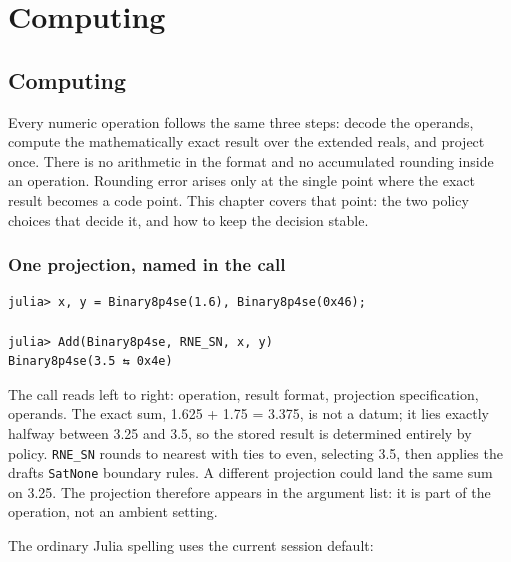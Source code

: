 \part{Computing}


\chapter{Computing}



\label{6001489924641501409}{}


Every numeric operation follows the same three steps: decode the operands, compute the mathematically exact result over the extended reals, and project once. There is no arithmetic {\textquotedbl}in the format{\textquotedbl} and no accumulated rounding inside an operation. Rounding error arises only at the single point where the exact result becomes a code point. This chapter covers that point: the two policy choices that decide it, and how to keep the decision stable.



\section{One projection, named in the call}



\label{13836310120754226451}{}



\begin{verbatim}
julia> x, y = Binary8p4se(1.6), Binary8p4se(0x46);

julia> Add(Binary8p4se, RNE_SN, x, y)
Binary8p4se(3.5 ⇆ 0x4e)
\end{verbatim}



The call reads left to right: operation, result format, projection specification, operands. The exact sum, 1.625 + 1.75 = 3.375, is not a datum; it lies exactly halfway between 3.25 and 3.5, so the stored result is determined entirely by policy. \texttt{RNE\_SN} rounds to nearest with ties to even, selecting 3.5, then applies the draft{\textquotesingle}s \texttt{SatNone} boundary rules. A different projection could land the same sum on 3.25. The projection therefore appears in the argument list: it is part of the operation, not an ambient setting.



The ordinary Julia spelling uses the current session default:




